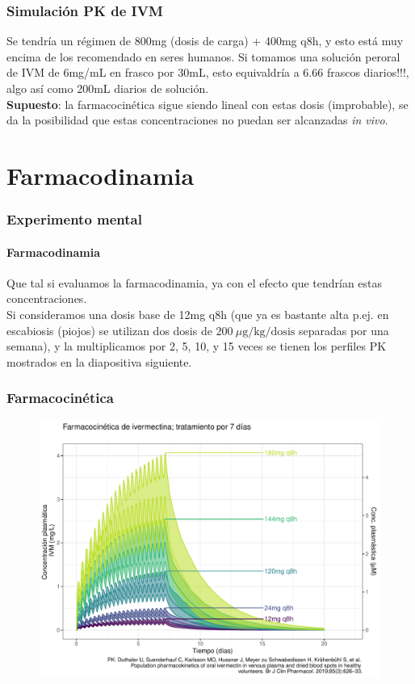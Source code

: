 \documentclass[12pt]{beamer}
\begin{document}
	\begin{frame}
		\frametitle[Experimento mental]{Simulación PK de IVM}
		\small
		Se tendría un régimen de 800mg (dosis de carga) + 400mg q8h, y esto está muy encima de los recomendado en seres humanos. Si tomamos una solución peroral de IVM de 6mg/mL en frasco por 30mL, esto equivaldría a 6.66 frascos diarios!!!, algo así como 200mL diarios de solución. \\
		\vspace{4em}
		\textbf{Supuesto}: la farmacocinética sigue siendo lineal con estas dosis (improbable), se da la posibilidad que estas concentraciones no puedan ser alcanzadas \textit{in vivo}.
	\end{frame}
	
	\section{Farmacodinamia}
	
	\begin{frame}
		\frametitle[]{Experimento mental}\framesubtitle{Farmacodinamia}
		Que tal si evaluamos la farmacodinamia, ya con el efecto que tendrían estas concentraciones. \\
		\vspace{2em}
		Si consideramos una dosis base de 12mg q8h (que ya es bastante alta p.ej. en escabiosis (piojos) se utilizan dos dosis de $200~\mu\mathrm{g/kg/dosis}$ separadas por una semana), y la multiplicamos por 2, 5, 10, y 15 veces se tienen los perfiles PK mostrados en la diapositiva siguiente. 
	\end{frame}

	\begin{frame}	
		\frametitle{Farmacocinética}			
		\begin{figure}
			\centering
			\includegraphics[width=0.9\linewidth]{../modelo_PD_2/figuras/G1}
			\label{fig:g1}
		\end{figure}
	\end{frame}
	
\end{document}
